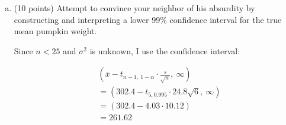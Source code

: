 \documentclass{article}\usepackage{graphicx, color}
\providecommand{\ov}[1]{\overline{#1}}
\numberwithin{equation}{section}
\begin{document}
\begin{flushleft}
\begin{enumerate}[1. ]
\begin{enumerate}[a. ]
{\color{red}

First, I calculate the mean weight to be:
\begin{align*}
\ov{x} &= \frac{1}{6} (311.0 + 271.1 + \cdots + 304.4) = 302.3
\intertext{and the standard deviation is:}
s &= \frac{1}{6-1}[(311.0 - 302.3)^2 + (271.1 - 302.3)^2 + \cdots + (304.4 - 302.3)^2] = 24.8
\end{align*}

And here is the hypothesis test:

\begin{enumerate}[1. ]
\item $H_0: \mu = 290$, $H_a: \mu > 290$, where $\mu $ is the true mean combined pumpkin weight.
\item $\alpha = 0.05$
\item I use the test statistic:
\begin{align*}
K = \frac{\ov{x} - 290}{s/\sqrt{n}}
\end{align*}
I assume the combined pumpkin weights are iid $N(\mu, \sigma^2)$. Under the additional assumption that $H_0$ is true, $K \sim t_{n - 1} = t_5$. I will reject $H_0$ if $K > t_{n - 1, 1 - \alpha} = t_{5, 0.95} = 2.02$
\item The moment of truth:
\begin{align*}
K &= \frac{302.3 - 290}{24.8/\sqrt{6}} = 1.21 \\
\end{align*} 
\item With a test statistic of $K =1.21 < 2.02 = t_{n - 1, 1 - \alpha}$, I fail to reject $H_0$. 
\item There is not enough evidence to conclude that your neighbor's true mean combined pumpkin weight (per year) exceeds 290 lb.
\end{enumerate}

}


\item (10 points) Attempt to convince your neighbor of his absurdity by constructing and interpreting a lower 99\% confidence interval for the true mean pumpkin weight.


{\color{red}
Since $n < 25$ and $\sigma^2 $ is unknown, I use the confidence interval:

\begin{align*}
&(\ov{x} - t_{n - 1, \ 1 - \alpha} \cdot \frac{s}{\sqrt{n}}, \ \infty) \\
&= (302.4 - t_{5, 0.995} \cdot{24.8}\sqrt{6}, \ \infty) \\
& = (302.4 - 4.03 \cdot 10.12) \\
&= 261.62
\end{align*}

}
\end{enumerate}
\end{enumerate}
\end{flushleft}
\end{document}
